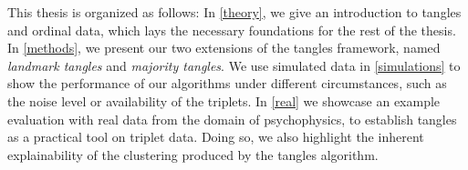 This thesis is organized as follows: In \autoref{theory}, we give an introduction to tangles and ordinal data, which lays the necessary foundations for the rest of the thesis. 
In \autoref{methods}, we present our two extensions of the tangles framework, named \textit{landmark tangles} and \textit{majority tangles}.
We use simulated data in \autoref{simulations} to show the performance of our algorithms under different circumstances, such as the noise level or availability of the triplets. 
In \autoref{real} we showcase an example evaluation with real data from the domain of psychophysics, to establish tangles as a practical tool on triplet data.
Doing so, we also highlight the inherent explainability of the clustering produced by 
the tangles algorithm. 

